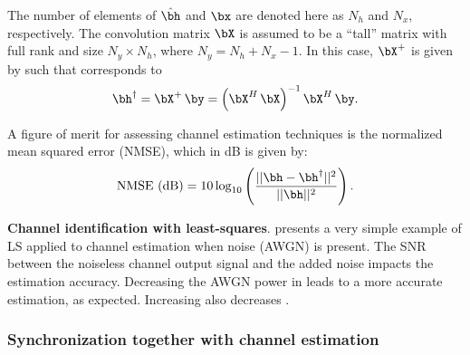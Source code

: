 The number of elements of $\hat \bh$ and $\bx$ are denoted here as $N_h$ and $N_x$, respectively. The convolution matrix $\bX$ is assumed to be a ``tall'' matrix with full rank and
size $N_y \times N_h$, where $N_y = N_h + N_x - 1$. In this case, $\bX^{+}$ is given by  such that  corresponds to
\begin{equation}
{\bh}^\dag = \bX^{+} \,  \by = \left( \bX^H \, \bX \right)^{-1}  \bX^H \,  \by.
\label{eq:ls_solution}
\end{equation}

A figure of merit for assessing channel estimation techniques is the normalized mean squared error (NMSE), which in dB is given by:
\begin{equation}
\textrm{NMSE (dB)} = 10 \log_{10} \left( \frac{||\bh-\bh^\dag||^2}{||\bh||^2} \right).
\label{eq:nmse_dB}
\end{equation}

\bExample \textbf{Channel identification with least-squares}.
 presents a very simple example of LS applied to channel estimation when noise (AWGN) is present.
The SNR between the noiseless channel output signal and the added noise impacts the estimation accuracy.
Decreasing the AWGN power in  leads to a more accurate estimation, as expected. Increasing  also decreases .
\eExample

\subsubsection{Synchronization together with channel estimation}

